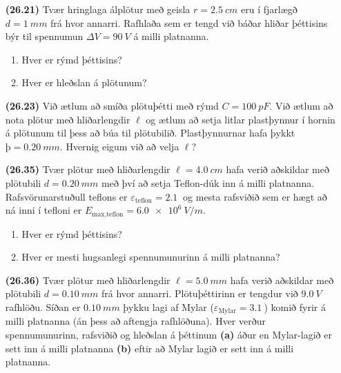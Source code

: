 \ifdefined \wholebook \else\documentclass[oneside]{book}\usepackage{EdlBook}\graphicspath{{figures/}}
\begin{document}
\begin{enumerate}[label = \textbf{(\alph*)}]

\item[\textbf{(26.21)}] Tvær hringlaga álplötur með geisla $r = \SI{2.5}{cm}$ eru í fjarlægð $d = \SI{1}{mm}$ frá hvor annarri. Rafhlaða sem er tengd við báðar hliðar þéttisins býr til spennumun $\Delta V = \SI{90}{V}$ á milli platnanna.

\begin{enumerate}[label = \textbf{(\alph*)}]
    \item Hver er rýmd þéttisins?
    \item Hver er hleðslan á plötunum?
\end{enumerate}

\item[\textbf{(26.23)}] Við ætlum að smíða plötuþétti með rýmd $C = \SI{100}{pF}$. Við ætlum að nota plötur með hliðarlengdir $\ell$ og ætlum að setja litlar plastþynnur í hornin á plötunum til þess að búa til plötubilið. Plastþynnurnar hafa þykkt $þ = \SI{0.20}{mm}$. Hvernig eigum við að velja $\ell$?

\item[\textbf{(26.35)}] Tvær plötur með hliðarlengdir $\ell = \SI{4.0}{cm}$ hafa verið aðskildar með plötubili $d = \SI{0.20}{mm}$ með því að setja Teflon-dúk inn á milli platnanna. Rafsvörunarstuðull teflons er $\varepsilon_{\text{teflon}} = \SI{2.1}{}$ og mesta rafsviðið sem er hægt að ná inni í tefloni er $E_{\text{max,teflon}} = \SI{6.0e6}{V/m}$.
\begin{enumerate}[label = \textbf{(\alph*)}]
    \item Hver er rýmd þéttisins?
    \item Hver er mesti hugsanlegi spennumunurinn á milli platnanna?
\end{enumerate}

\item[\textbf{(26.36)}] Tvær plötur með hliðarlengdir $\ell = \SI{5.0}{mm}$ hafa verið aðskildar með plötubili $d = \SI{0.10}{mm}$ frá hvor annarri. Plötuþéttirinn er tengdur við $\SI{9.0}{V}$ rafhlöðu. Síðan er $\SI{0.10}{mm}$ þykku lagi af Mylar ($\varepsilon_{\text{Mylar}} = \SI{3.1}{}$) komið fyrir á milli platnanna (án þess að aftengja rafhlöðuna). Hver verður spennumunurinn, rafsviðið og hleðslan á þéttinum \textbf{(a)} áður en Mylar-lagið er sett inn á milli platnanna \textbf{(b)} eftir að Mylar lagið er sett inn á milli platnanna.
\end{enumerate}
\end{document}
